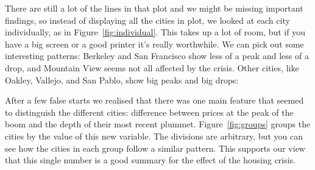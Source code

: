 \documentclass[oneside]{article}
\begin{document}
There are still a lot of the lines in that plot and we might be missing important findings, so instead of displaying all the cities in plot, we looked at each city individually, as in Figure~\ref{fig:individual}.  This takes up a lot of room, but if you have a big screen or a good printer it's really worthwhile.  We can pick out some interesting patterns: Berkeley and San Francisco show less of a peak and less of a drop, and Mountain View seems not all affected by the crisis.  Other cities, like Oakley, Vallejo, and San Pablo, show big peaks and big drops: 



% 
% 

After a few false starts we realised that there was one main feature that seemed to distinguish the different cities: difference between prices at the peak of the boom and the depth of their most recent plummet.  Figure~\ref{fig:groups} groups the cities by the value of this new variable.  The divisions are arbitrary, but you can see how the cities in each group follow a similar pattern.  This supports our view that this single number is a good summary for the effect of the housing crisis.
\end{document}
